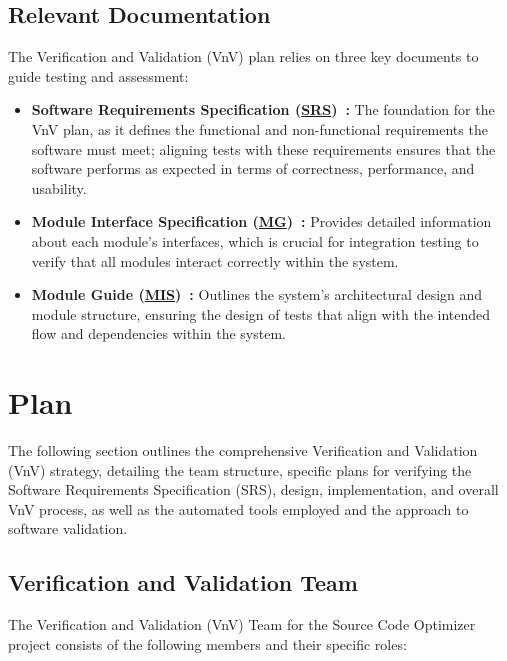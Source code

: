\documentclass[12pt, titlepage]{article}
\newcommand{\SRS}{\href{https://github.com/ssm-lab/capstone--source-code-optimizer/blob/main/docs/SRS/SRS.pdf}{SRS}}
\newcommand{\MG}{\href{https://github.com/ssm-lab/capstone--source-code-optimizer/blob/main/docs/Design/SoftArchitecture/MG.pdf}{MG}}
\newcommand{\MIS}{\href{https://github.com/ssm-lab/capstone--source-code-optimizer/blob/main/docs/Design/SoftDetailedDes/MIS.pdf}{MIS}}
\begin{document}
\subsection{Relevant Documentation}

The Verification and Validation (VnV) plan relies on three key
documents to guide testing and assessment:
\begin{itemize}
  \item[] \textbf{Software Requirements Specification
    (\SRS)~\cite{SRS}:} The foundation for the VnV plan, as it
    defines the functional and non-functional requirements the
    software must meet; aligning tests with these requirements
    ensures that the software performs as expected in terms of
    correctness, performance, and usability.

  \item[] \textbf{Module Interface Specification (\MG)~\cite{MGDoc}:}
    Provides detailed information about each module's interfaces,
    which is crucial for integration testing to verify that all
    modules interact correctly within the system.

  \item[] \textbf{Module Guide (\MIS)~\cite{MISDoc}:} Outlines the
    system's architectural design and module structure, ensuring the
    design of tests that align with the intended flow and
    dependencies within the system.
\end{itemize}

\section{Plan}

The following section outlines the comprehensive Verification and
Validation (VnV) strategy, detailing the team structure, specific
plans for verifying the Software Requirements Specification (SRS),
design, implementation, and overall VnV process, as well as the
automated tools employed and the approach to software validation.

\subsection{Verification and Validation Team}

The Verification and Validation (VnV) Team for the Source Code
Optimizer project consists of the following members and their specific roles:
\end{document}

